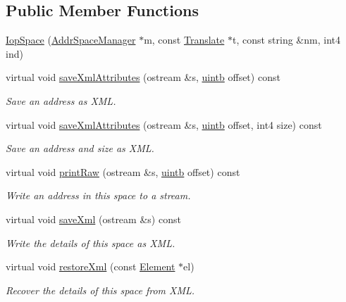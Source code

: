 \subsection*{Public Member Functions}
\begin{DoxyCompactItemize}
\item 
\mbox{\hyperlink{class_iop_space_aeacf0e01de647ce00ae448ce89eba45a}{Iop\+Space}} (\mbox{\hyperlink{class_addr_space_manager}{Addr\+Space\+Manager}} $\ast$m, const \mbox{\hyperlink{class_translate}{Translate}} $\ast$t, const string \&nm, int4 ind)
\item 
virtual void \mbox{\hyperlink{class_iop_space_a74fe87f16204159a66ea95cc0d9b3355}{save\+Xml\+Attributes}} (ostream \&s, \mbox{\hyperlink{types_8h_a2db313c5d32a12b01d26ac9b3bca178f}{uintb}} offset) const
\begin{DoxyCompactList}\small\item\em Save an address as X\+ML. \end{DoxyCompactList}\item 
virtual void \mbox{\hyperlink{class_iop_space_a789703a65652db483ba72c9503c06cc5}{save\+Xml\+Attributes}} (ostream \&s, \mbox{\hyperlink{types_8h_a2db313c5d32a12b01d26ac9b3bca178f}{uintb}} offset, int4 size) const
\begin{DoxyCompactList}\small\item\em Save an address and size as X\+ML. \end{DoxyCompactList}\item 
virtual void \mbox{\hyperlink{class_iop_space_aa5e2fc99ee39d375ef563cd3fea2101d}{print\+Raw}} (ostream \&s, \mbox{\hyperlink{types_8h_a2db313c5d32a12b01d26ac9b3bca178f}{uintb}} offset) const
\begin{DoxyCompactList}\small\item\em Write an address in this space to a stream. \end{DoxyCompactList}\item 
virtual void \mbox{\hyperlink{class_iop_space_a916e2a73cc1dd79b4f5d86ec6c39a9a4}{save\+Xml}} (ostream \&s) const
\begin{DoxyCompactList}\small\item\em Write the details of this space as X\+ML. \end{DoxyCompactList}\item 
virtual void \mbox{\hyperlink{class_iop_space_a7c530a1e977334d59d2ebbc33147bcd9}{restore\+Xml}} (const \mbox{\hyperlink{class_element}{Element}} $\ast$el)
\begin{DoxyCompactList}\small\item\em Recover the details of this space from X\+ML. \end{DoxyCompactList}\end{DoxyCompactItemize}
